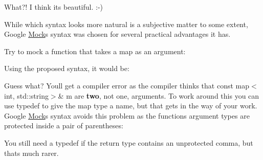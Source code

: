What?! I think it\textquotesingle{}s beautiful. \+:-\/)

While which syntax looks more natural is a subjective matter to some extent, Google \mbox{\hyperlink{classMock}{Mock}}\textquotesingle{}s syntax was chosen for several practical advantages it has.

Try to mock a function that takes a map as an argument\+: 
\begin{DoxyCode}{0}
\end{DoxyCode}


Using the proposed syntax, it would be\+: 
\begin{DoxyCode}{0}
\end{DoxyCode}


Guess what? You\textquotesingle{}ll get a compiler error as the compiler thinks that {\ttfamily const map$<$int, std\+::string$>$\& m} are {\bfseries{two}}, not one, arguments. To work around this you can use {\ttfamily typedef} to give the map type a name, but that gets in the way of your work. Google \mbox{\hyperlink{classMock}{Mock}}\textquotesingle{}s syntax avoids this problem as the function\textquotesingle{}s argument types are protected inside a pair of parentheses\+: 
\begin{DoxyCode}{0}
\end{DoxyCode}


You still need a {\ttfamily typedef} if the return type contains an unprotected comma, but that\textquotesingle{}s much rarer.

